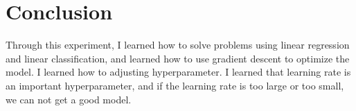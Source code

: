\documentclass[journal, a4paper]{IEEEtran}
\begin{document}
\section{Conclusion}

    Through this experiment, I learned how to solve problems using linear regression and linear classification, and learned how to use gradient descent to optimize the model. I learned how to adjusting hyperparameter. I learned that learning rate is an important hyperparameter, and if the learning rate is too large or too small, we can not get a good model.


\end{document}
